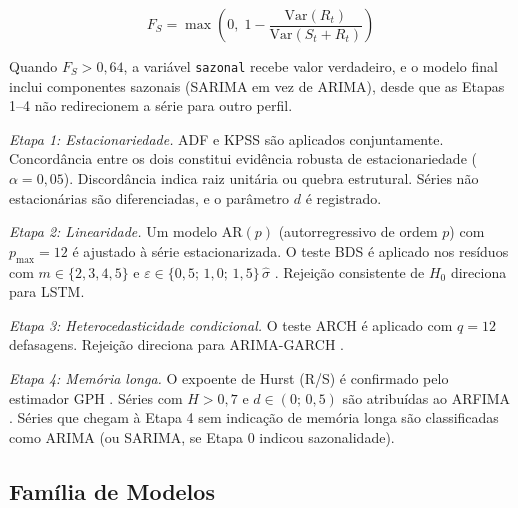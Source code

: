 \documentclass[12pt, a4paper]{article}
\begin{document}
\begin{equation}
  F_S = \max\!\left(0,\; 1 - \frac{\text{Var}(R_t)}{\text{Var}(S_t + R_t)}\right)
  \label{eq:fs}
\end{equation}

Quando $F_S > 0{,}64$, a variável \texttt{sazonal} recebe valor verdadeiro,
e o modelo final inclui componentes sazonais (SARIMA em vez de ARIMA), desde
que as Etapas 1–4 não redirecionem a série para outro perfil.

\textit{Etapa 1: Estacionariedade.} ADF e KPSS são aplicados
conjuntamente. Concordância entre os dois constitui evidência robusta de
estacionariedade ($\alpha = 0{,}05$). Discordância indica raiz unitária ou
quebra estrutural. Séries não estacionárias são diferenciadas, e o parâmetro
$d$ é registrado.

\textit{Etapa 2: Linearidade.} Um modelo AR$(p)$ (autorregressivo de
ordem $p$) com $p_{\max} = 12$ é ajustado à série estacionarizada. O teste BDS é aplicado nos resíduos com
$m \in \{2, 3, 4, 5\}$ e $\varepsilon \in \{0{,}5;\, 1{,}0;\, 1{,}5\}\,\hat{\sigma}$
\cite{broock1996test}. Rejeição consistente de $H_0$ direciona para LSTM.

\textit{Etapa 3: Heterocedasticidade condicional.} O teste ARCH é aplicado
com $q = 12$ defasagens. Rejeição direciona para ARIMA-GARCH
\cite{bollerslev1986generalized}.

\textit{Etapa 4: Memória longa.} O expoente de Hurst (R/S) é confirmado
pelo estimador GPH \cite{geweke1983estimation}. Séries com $H > 0{,}7$ e
$d \in (0;\, 0{,}5)$ são atribuídas ao ARFIMA \cite{granger1980introduction}.
Séries que chegam à Etapa 4 sem indicação de memória longa são classificadas
como ARIMA (ou SARIMA, se Etapa 0 indicou sazonalidade).

\subsection{Família de Modelos}
\end{document}
